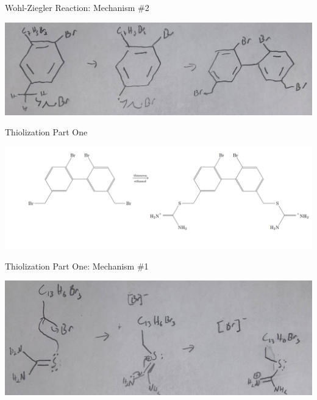 \documentclass[notes]{beamer}
\begin{document}
\begin{frame}{Wohl-Ziegler Reaction: Mechanism \#2}

\begin{center}
    \includegraphics[scale=.35]{wohl_ziegler_two.JPG}
\end{center}
    
\note{\begin{itemize}
    \item 
\end{itemize}}

\end{frame}

\begin{frame}{Thiolization Part One}
\begin{center}
    \includegraphics[scale=.4]{thiolization_part_one_overall.PNG}
\end{center}
\end{frame}

\begin{frame}{Thiolization Part One: Mechanism \#1}
\begin{center}
    \includegraphics[scale=.4]{thiolization_part_one_one.JPG}
\end{center}
\end{frame}
\end{document}
